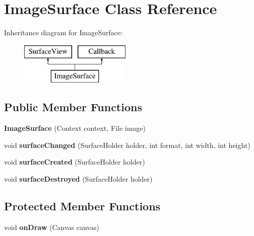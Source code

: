 \hypertarget{class_image_surface}{}\section{Image\+Surface Class Reference}
\label{class_image_surface}
Inheritance diagram for Image\+Surface\+:\begin{figure}[H]
\begin{center}
\leavevmode
\includegraphics[height=2.000000cm]{class_image_surface}
\end{center}
\end{figure}
\subsection*{Public Member Functions}
\begin{DoxyCompactItemize}
\item 
\mbox{\label{class_image_surface_a54d56d1b71d0288c7d4ea9c33b0387ff}} 
{\bfseries Image\+Surface} (Context context, File image)
\item 
\mbox{\label{class_image_surface_a5c4da910ab0011bc8d22781854973c30}} 
void {\bfseries surface\+Changed} (Surface\+Holder holder, int format, int width, int height)
\item 
\mbox{\label{class_image_surface_a0c415710e7d98203d7ba4620aa45d7ba}} 
void {\bfseries surface\+Created} (Surface\+Holder holder)
\item 
\mbox{\label{class_image_surface_a207ed50cfd1cd7849a0354e9a947a939}} 
void {\bfseries surface\+Destroyed} (Surface\+Holder holder)
\end{DoxyCompactItemize}
\subsection*{Protected Member Functions}
\begin{DoxyCompactItemize}
\item 
\mbox{\label{class_image_surface_a4ba5f36204569fdce7958910d362a758}} 
void {\bfseries on\+Draw} (Canvas canvas)
\end{DoxyCompactItemize}
